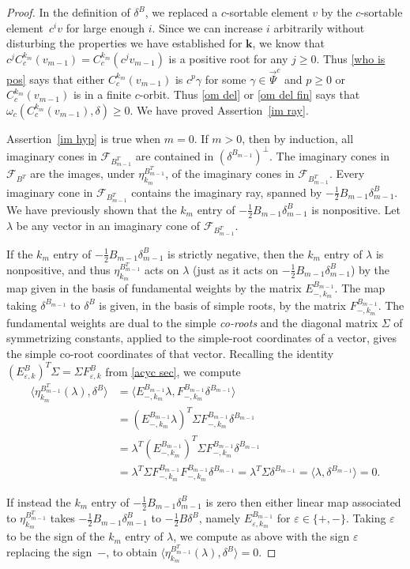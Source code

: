 \documentclass{amsart}
\theoremstyle{definition}
\theoremstyle{remark}
\numberwithin{equation}{section}
\newcommand{\ep}{\varepsilon}
\newcommand{\set}[1]{{\lbrace #1 \rbrace}}
\newcommand{\br}[1]{{\langle #1 \rangle}}
\newcommand{\F}{{\mathcal F}}
\newcommand{\0}{{\mathbf{0}}}
\newcommand{\kk}{{\boldsymbol{k}}}
\newcommand{\TravInfChar}{\Psi}
\newcommand{\TravProj}[1]{\overrightarrow{\TravInfChar}^{#1}}
\begin{document}
\begin{proof}
In the definition of $\delta^B$, we replaced a $c$-sortable element $v$ by the $c$-sortable element~$c^iv$ for large enough $i$.
Since we can increase $i$ arbitrarily without disturbing the properties we have established for $\kk$, we know that $c^jC^{k_m}_c(v_{m-1})=C^{k_m}_c(c^jv_{m-1})$ is a positive root for any $j\ge0$.
Thus \cref{who is pos} says that either $C^{k_m}_c(v_{m-1})$ is $c^p\gamma$ for some $\gamma\in\TravProj{c}$ and $p\ge0$ or $C^{k_m}_c(v_{m-1})$ is in a finite $c$-orbit.
Thus \cref{om del} or \cref{om del fin} says that $\omega_c(C^{k_m}_c(v_{m-1}),\delta)\ge0$. 
We have proved Assertion~\ref{im ray}.

Assertion~\ref{im hyp} is true when $m=0$.
If $m>0$, then by induction, all imaginary cones in $\F_{B_{m-1}^T}$ are contained in $(\delta^{B_{m-1}})^\perp$.
The imaginary cones in $\F_{B^T}$ are the images, under $\eta^{B^T_{m-1}}_{k_m}$, of the imaginary cones in $\F_{B_{m-1}^T}$.
Every imaginary cone in $\F_{B_{m-1}^T}$ contains the imaginary ray, spanned by $-\frac12B_{m-1}\delta^B_{m-1}$.
We have previously shown that the $k_m$ entry of $-\frac12B_{m-1}\delta^B_{m-1}$ is nonpositive.
Let $\lambda$ be any vector in an imaginary cone of $\F_{B_{m-1}^T}$.

If the $k_m$ entry of $-\frac12B_{m-1}\delta^B_{m-1}$ is strictly negative, then the $k_m$ entry of $\lambda$ is nonpositive, and thus $\eta^{B^T_{m-1}}_{k_m}$ acts on $\lambda$ (just as it acts on $-\frac12B_{m-1}\delta^B_{m-1}$) by the map given in the basis of fundamental weights by the matrix $E_{-,k_m}^{B_{m-1}}$.
The map taking $\delta^{B_{m-1}}$ to $\delta^B$ is given, in the basis of simple roots, by the matrix $F_{-,k_m}^{B_{m-1}}$.
The fundamental weights are dual to the simple \emph{co-roots} and the diagonal matrix $\Sigma$ of symmetrizing constants, applied to the simple-root coordinates of a vector, gives the simple co-root coordinates of that vector.
Recalling the identity $(E_{\ep,k}^B)^T\Sigma=\Sigma F_{\ep,k}^B$ from \cref{acyc sec}, we compute
\begin{align*}
\br{\eta^{B^T_{m-1}}_{k_m}(\lambda),\delta^B}
&=\br{E_{-,k_m}^{B_{m-1}}\lambda,F_{-,k_m}^{B_{m-1}}\delta^{B_{m-1}}}\\
&=(E_{-,k_m}^{B_{m-1}}\lambda)^T\Sigma F_{-,k_m}^{B_{m-1}}\delta^{B_{m-1}}\\
&=\lambda^T(E_{-,k_m}^{B_{m-1}})^T\Sigma F_{-,k_m}^{B_{m-1}}\delta^{B_{m-1}}\\
&=\lambda^T\Sigma F_{-,k_m}^{B_{m-1}}F_{-,k_m}^{B_{m-1}}\delta^{B_{m-1}}=\lambda^T\Sigma\delta^{B_{m-1}}=\br{\lambda,\delta^{B_{m-1}}}=0.
\end{align*}

If instead the $k_m$ entry of $-\frac12B_{m-1}\delta^B_{m-1}$ is zero then either linear map associated to $\eta^{B^T_{m-1}}_{k_m}$ takes $-\frac12B_{m-1}\delta^B_{m-1}$ to $-\frac12B\delta^B$, namely $E_{\ep,k_m}^{B_{m-1}}$ for $\ep\in\set{+,-}$.
Taking $\ep$ to be the sign of the $k_m$ entry of $\lambda$, we compute as above with the sign $\ep$ replacing the sign~$-$, to obtain $\br{\eta^{B^T_{m-1}}_{k_m}(\lambda),\delta^B}=0$.
\end{proof}
\end{document}
